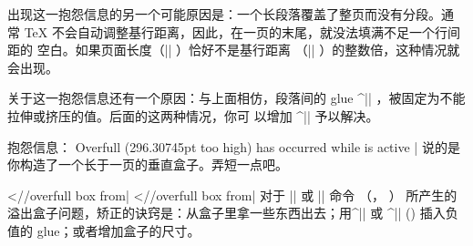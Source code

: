 
出现这一抱怨信息的另一个可能原因是：一个长段落覆盖了整页而没有分段。通
常 \TeX{} 不会自动调整基行距离，因此，在一页的末尾，就没法填满不足一个行间距的
空白。如果页面长度（|\vsize| \ctsref{\vsize}）恰好不是基行距离
（|\baselineskip| \ctsref{\baselineskip}）的整数倍，这种情况就会出现。


关于这一抱怨信息还有一个原因：与上面相仿，段落间的 glue ^|\parskip|
\ctsref{\parskip}，被固定为不能拉伸或挤压的值。后面的这两种情况，你可
以增加 ^|\vfuzz| \ctsref\vfuzz 予以解决。


\li 抱怨信息：
\csdisplay
Overfull \vbox (296.30745pt too high) has occurred
   while \output is active
|
说的是你构造了一个长于一页的垂直盒子。弄短一点吧。


\li
\bix^^|\hbox//overfull box from|
\bix^^|\vbox//overfull box from|
对于 |\hbox| 或 |\vbox| 命令 （\pp\xrefn\hbox， \xrefn\vbox） 所产生的
溢出盒子问题，矫正的诀窍是：从盒子里拿一些东西出去；用^|\hss| 或 ^|\vss| (\xref\hss)
插入负值的 glue；或者增加盒子的尺寸。


